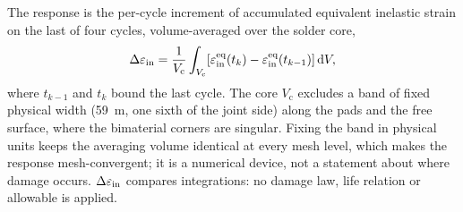 The response is the per-cycle increment of accumulated equivalent inelastic strain on the last of
four cycles, volume-averaged over the solder core,
\begin{equation}
\Delta\varepsilon_{\mathrm{in}} = \frac{1}{V_{\mathrm{c}}}\int_{V_{\mathrm{c}}}\!
\left[\varepsilon^{\mathrm{eq}}_{\mathrm{in}}(t_k)-\varepsilon^{\mathrm{eq}}_{\mathrm{in}}(t_{k-1})
\right]\mathrm{d}V,
\label{eq:deps}
\end{equation}
where $t_{k-1}$ and $t_k$ bound the last cycle. The core $V_{\mathrm{c}}$ excludes a band of fixed
physical width (59~\textmu m, one sixth of the joint side) along the pads and the free surface,
where the bimaterial corners are singular. Fixing the band in physical units keeps the averaging
volume identical at every mesh level, which makes the response mesh-convergent; it is a numerical
device, not a statement about where damage occurs. $\Delta\varepsilon_{\mathrm{in}}$ compares integrations: no damage law,
life relation or allowable is applied.


